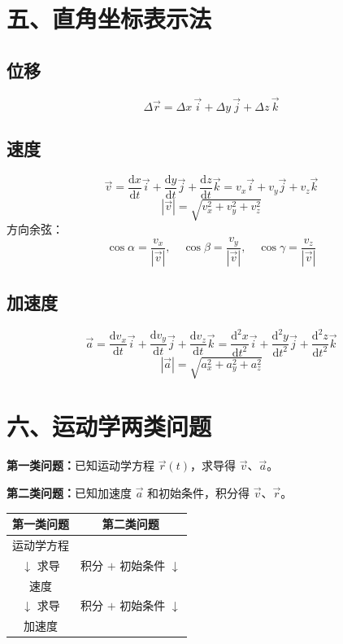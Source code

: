 \documentclass{ctexart}
\begin{document}
\section*{五、直角坐标表示法}

\subsection*{位移}
\[
\Delta\vec{r} = \Delta x\,\vec{i} + \Delta y\,\vec{j} + \Delta z\,\vec{k}
\]

\subsection*{速度}
\[
\vec{v} = \frac{\mathrm{d}x}{\mathrm{d}t}\vec{i} + \frac{\mathrm{d}y}{\mathrm{d}t}\vec{j} + \frac{\mathrm{d}z}{\mathrm{d}t}\vec{k}
= v_x\vec{i} + v_y\vec{j} + v_z\vec{k}
\]
\[
|\vec{v}| = \sqrt{v_x^{2} + v_y^{2} + v_z^{2}}
\]
方向余弦：
\[
\cos\alpha = \frac{v_x}{|\vec{v}|},\quad
\cos\beta = \frac{v_y}{|\vec{v}|},\quad
\cos\gamma = \frac{v_z}{|\vec{v}|}
\]

\subsection*{加速度}
\[
\vec{a} = \frac{\mathrm{d}v_x}{\mathrm{d}t}\vec{i} + \frac{\mathrm{d}v_y}{\mathrm{d}t}\vec{j} + \frac{\mathrm{d}v_z}{\mathrm{d}t}\vec{k}
= \frac{\mathrm{d}^{2}x}{\mathrm{d}t^{2}}\vec{i} + \frac{\mathrm{d}^{2}y}{\mathrm{d}t^{2}}\vec{j} + \frac{\mathrm{d}^{2}z}{\mathrm{d}t^{2}}\vec{k}
\]
\[
|\vec{a}| = \sqrt{a_x^{2} + a_y^{2} + a_z^{2}}
\]

\section*{六、运动学两类问题}

\textbf{第一类问题：}已知运动学方程 $\vec{r}(t)$，求导得 $\vec{v}$、$\vec{a}$。

\textbf{第二类问题：}已知加速度 $\vec{a}$ 和初始条件，积分得 $\vec{v}$、$\vec{r}$。

\begin{center}
\begin{tabular}{c|c}
\hline
第一类问题 & 第二类问题 \\
\hline
运动学方程 & \\
$\downarrow$ 求导 & 积分 $+$ 初始条件 $\downarrow$ \\
速度 & \\
$\downarrow$ 求导 & 积分 $+$ 初始条件 $\downarrow$ \\
加速度 & \\
\hline
\end{tabular}
\end{center}
\end{document}
